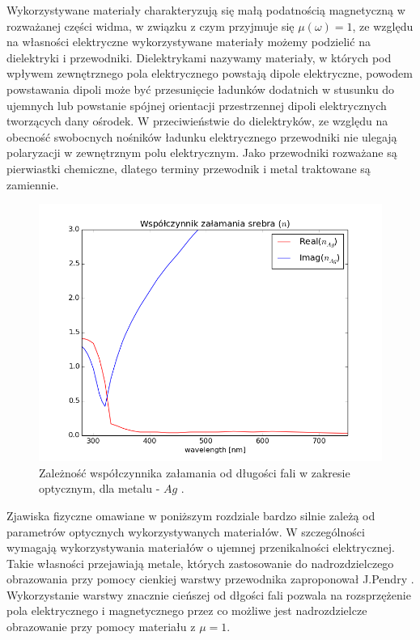 Wykorzystywane materiały charakteryzują się małą podatnością magnetyczną w rozważanej części widma, w związku z czym przyjmuje się $\mu(\omega)=1$, ze względu na własności elektryczne wykorzystywane materiały możemy  podzielić na dielektryki i przewodniki. Dielektrykami nazywamy materiały, w których pod wpływem zewnętrznego pola elektrycznego powstają dipole elektryczne, powodem powstawania dipoli może być przesunięcie ładunków dodatnich w stusunku do ujemnych lub powstanie spójnej orientacji przestrzennej dipoli elektrycznych tworzących dany ośrodek. W przeciwieństwie do dielektryków, ze względu na obecność swobocnych nośników ładunku elektrycznego przewodniki nie ulegają polaryzacji w zewnętrznym polu elektrycznym. Jako przewodniki rozważane są pierwiastki chemiczne, dlatego terminy przewodnik i metal traktowane są zamiennie.

\begin{figure}[tb]
	\includegraphics[width=\textwidth]{images/agn.png}
	\caption{Zależność współczynnika załamania od długości fali w zakresie optycznym, dla metalu -  $Ag$ \cite{PhysRevB.6.4370} .  }
	\label{fig:agn}
\end{figure}
Zjawiska fizyczne omawiane w poniższym rozdziale bardzo silnie zależą od parametrów optycznych wykorzystywanych materiałów. W szczególności wymagają wykorzystywania materiałów o ujemnej przenikalności elektrycznej. Takie własności przejawiają metale, których zastosowanie do nadrozdzielczego obrazowania przy pomocy cienkiej warstwy przewodnika zaproponował J.Pendry \cite{PhysRevLett.85.396}. Wykorzystanie warstwy znacznie cieńszej od dłgości fali pozwala na rozsprzężenie pola elektrycznego i magnetycznego przez co możliwe jest nadrozdzielcze obrazowanie przy pomocy materiału z $\mu=1$.  

